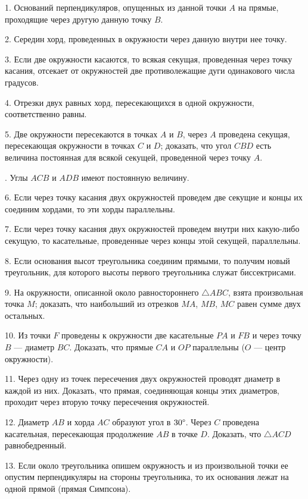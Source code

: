 \documentclass[oneside]{book}
\begin{document}

1.
Оснований перпендикуляров, опущенных из данной точки $A$ на прямые, проходящие через другую данную точку $B$.

2.
Середин хорд, проведенных в окружности через данную внутри нее точку.


3.
Если две окружности касаются, то всякая секущая, проведенная через точку касания, отсекает от окружностей две противолежащие дуги одинакового числа градусов.

4.
Отрезки двух равных хорд, пересекающихся в одной окружности, соответственно равны.

5.
Две окружности пересекаются в точках $A$ и $B$, через $A$ проведена секущая, пересекающая окружности в точках $C$ и $D$;
доказать, что угол $CBD$ есть величина постоянная для всякой секущей, проведенной через точку $A$.

.
Углы $ACB$ и $ADB$ имеют постоянную величину.

6.
Если через точку касания двух окружностей проведем две секущие и концы их соединим хордами, то эти хорды параллельны.

7.
Если через точку касания двух окружностей проведем внутри них какую-либо секущую, то касательные, проведенные через концы этой секущей, параллельны.

8.
Если основания высот треугольника соединим прямыми, то получим новый треугольник, для которого высоты первого треугольника служат биссектрисами. %

9.
На окружности, описанной около равностороннего $\triangle ABC$, взята произвольная точка $M$;
доказать, что наибольший из отрезков $MA$, $MB$, $MC$ равен сумме двух остальных.

10.
Из точки $F$ проведены к окружности две касательные $PA$ и $FB$ и через точку $B$ — диаметр $BC$.
Доказать, что прямые $CA$ и $OP$ параллельны ($O$ — центр окружности).

11.
Через одну из точек пересечения двух окружностей проводят диаметр в каждой из них.
Доказать, что прямая, соединяющая концы этих диаметров, проходит через вторую точку пересечения окружностей.

12.
Диаметр $AB$ и хорда $AC$ образуют угол в $30\degree$.
Через $C$ проведена касательная, пересекающая продолжение $AB$ в точке $D$.
Доказать, что $\triangle ACD$ равнобедренный.

13.
Если около треугольника опишем окружность и из произвольной точки ее опустим перпендикуляры на стороны треугольника, то их основания лежат на одной прямой (прямая Симпсона).
\end{document}

